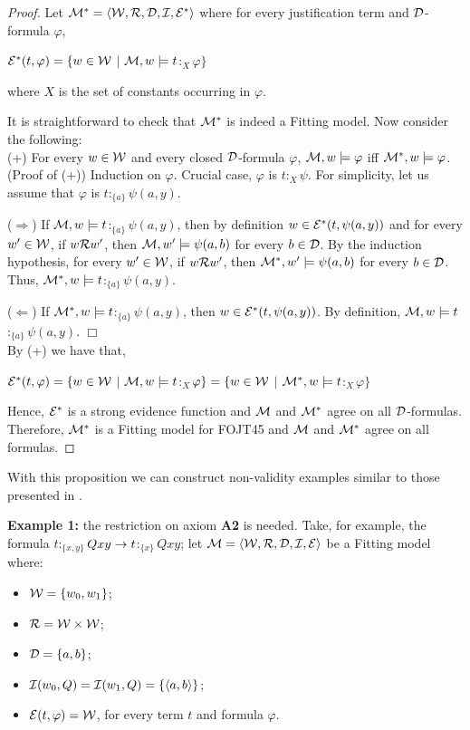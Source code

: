 \begin{proof}
	\qquad Let $\mathcal{M}^{*} =\langle\mathcal{W},\mathcal{R},\mathcal{D},\mathcal{I},\mathcal{E}^{*} \rangle$ where for every justification term and $\mathcal{D}$-formula $\varphi$,
	
	\begin{center}
		$\mathcal{E}^{*}(t,\varphi) = \{w \in \mathcal{W}$ $|$ $ \mathcal{M},w \models t$$:_{X}$$\varphi\}$
	\end{center}
where $X$ is the set of constants occurring in $\varphi$. 
	
	\qquad It is straightforward to check that $\mathcal{M}^{*}$ is indeed a Fitting model. Now consider the following:\\
	
	(+) For every $w \in \mathcal{W}$ and every closed $\mathcal{D}$-formula $\varphi$, $\mathcal{M},w \models \varphi$ iff $\mathcal{M}^{*},w \models \varphi$.\\
	
	(Proof of (+)) Induction on $\varphi$. Crucial case, $\varphi$ is $t$$:_{X}$$\psi$. For simplicity, let us assume that $\varphi$ is $t$$:_{\{a\}}$$\psi(a,y)$.
	
	\qquad ($\Rightarrow$) If $\mathcal{M},w \models t$$:_{\{a\}}$$\psi(a,y)$, then by definition $w \in \mathcal{E}^{*}(t, \psi(a,y))$ and for every $w^{\prime} \in \mathcal{W}$, if $w\mathcal{R} w^{\prime}$, then $\mathcal{M},w^{\prime} \models \psi(a,b)$ for every $b \in \mathcal{D}$. By the induction hypothesis, for every $w^{\prime} \in \mathcal{W}$, if $w\mathcal{R} w^{\prime}$, then $\mathcal{M}^{*},w^{\prime} \models \psi(a,b)$ for every $b \in \mathcal{D}$. Thus, $\mathcal{M}^{*},w \models t$$:_{\{a\}}$$\psi(a,y)$.
	
	\qquad ($\Leftarrow$) If $\mathcal{M}^{*},w \models t$$:_{\{a\}}$$\psi(a,y)$, then $w \in \mathcal{E}^{*}(t, \psi(a,y))$. By definition, $\mathcal{M},w \models t$$:_{\{a\}}$$\psi(a,y)$. $\Box$\\
	
	
	\qquad By (+) we have that,
	
	\begin{center}
		$\mathcal{E}^{*}(t,\varphi) = \{w \in \mathcal{W}$ $|$ $ \mathcal{M},w \models t$$:_{X}$$\varphi\} = \{w \in \mathcal{W}$ $|$ $ \mathcal{M}^{*},w \models t$$:_{X}$$\varphi\}$
	\end{center}
	
	
	\qquad Hence, $\mathcal{E}^{*}$ is a strong evidence function and $\mathcal{M}$ and $\mathcal{M}^{*}$ agree on all $\mathcal{D}$-formulas. Therefore, $\mathcal{M}^{*}$ is a Fitting model for FOJT45 and $\mathcal{M}$ and $\mathcal{M}^{*}$ agree on all formulas.
\end{proof}


\qquad With this proposition we can construct non-validity examples similar to those presented in \cite{Fitting14}.

\qquad \textbf{Example 1:} the restriction on axiom \textbf{A2} is needed. Take, for example, the formula $t$$:_{\{x,y\}}$$Qxy \rightarrow t$$:_{\{x\}}$$Qxy$; let $\mathcal{M} =\langle\mathcal{W},\mathcal{R},\mathcal{D},\mathcal{I},\mathcal{E} \rangle$ be a Fitting model where:
\begin{itemize}
	\item $\mathcal{W} = \{w_0, w_1\}$;
	\item $\mathcal{R} = \mathcal{W} \times \mathcal{W}$;
	\item $\mathcal{D} = \{a, b\}$;
	\item $\mathcal{I}(w_{0},Q) = \mathcal{I}(w_{1},Q) = \{\langle a,b \rangle\}$;
	\item $\mathcal{E}(t,\varphi) = \mathcal{W}$, for every term $t$ and formula $\varphi$.
\end{itemize}



